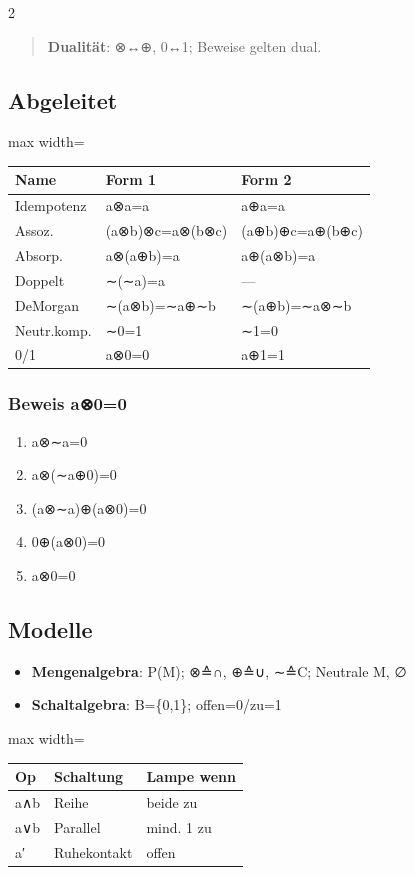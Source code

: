\documentclass[10pt, a4paper]{article}
\begin{document}
\begin{multicols}{2}
\begin{quote}
\textbf{Dualität}: ⊗↔⊕, 0↔1; Beweise gelten dual.
\end{quote}


\subsection{Abgeleitet}

{\small
\begin{adjustbox}{max width=\linewidth}
{\scriptsize
\begin{tabular}{lll}
\toprule
\textbf{Name} & \textbf{Form 1} & \textbf{Form 2} \\
\midrule
Idempotenz & a⊗a=a & a⊕a=a \\
Assoz. & (a⊗b)⊗c=a⊗(b⊗c) & (a⊕b)⊕c=a⊕(b⊕c) \\
Absorp. & a⊗(a⊕b)=a & a⊕(a⊗b)=a \\
Doppelt & ∼(∼a)=a & — \\
DeMorgan & ∼(a⊗b)=∼a⊕∼b & ∼(a⊕b)=∼a⊗∼b \\
Neutr.komp. & ∼0=1 & ∼1=0 \\
0/1 & a⊗0=0 & a⊕1=1 \\
\bottomrule
\end{tabular}
}
\end{adjustbox}
}



\subsubsection{Beweis a⊗0=0}
\begin{enumerate}
  \item a⊗∼a=0
  \item a⊗(∼a⊕0)=0
  \item (a⊗∼a)⊕(a⊗0)=0
  \item 0⊕(a⊗0)=0
  \item a⊗0=0
\end{enumerate}


\subsection{Modelle}
\begin{itemize}
  \item \textbf{Mengenalgebra}: P(M); ⊗≙∩, ⊕≙∪, ∼≙C; Neutrale M, ∅
  \item \textbf{Schaltalgebra}: B=\{0,1\}; offen=0/zu=1
\end{itemize}


{\small
\begin{adjustbox}{max width=\linewidth}
{\scriptsize
\begin{tabular}{lll}
\toprule
\textbf{Op} & \textbf{Schaltung} & \textbf{Lampe wenn} \\
\midrule
a∧b & Reihe & beide zu \\
a∨b & Parallel & mind. 1 zu \\
a′ & Ruhekontakt & offen \\
\bottomrule
\end{tabular}
}
\end{adjustbox}
}




\end{multicols}
\end{document}

